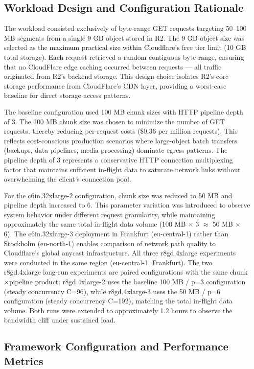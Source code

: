 \subsection{Workload Design and Configuration Rationale}

The workload consisted exclusively of byte-range GET requests targeting 50--100 MB segments from a single 9 GB object stored in R2. The 9 GB object size was selected as the maximum practical size within Cloudflare's free tier limit (10 GB total storage). Each request retrieved a random contiguous byte range, ensuring that no CloudFlare edge caching occurred between requests --- all traffic originated from R2's backend storage. This design choice isolates R2's core storage performance from CloudFlare's CDN layer, providing a worst-case baseline for direct storage access patterns.

The baseline configuration used 100 MB chunk sizes with HTTP pipeline depth of 3. The 100 MB chunk size was chosen to minimize the number of GET requests, thereby reducing per-request costs (\$0.36 per million requests). This reflects cost-conscious production scenarios where large-object batch transfers (backups, data pipelines, media processing) dominate egress patterns. The pipeline depth of 3 represents a conservative HTTP connection multiplexing factor that maintains sufficient in-flight data to saturate network links without overwhelming the client's connection pool.

For the c6in.32xlarge-2 configuration, chunk size was reduced to 50 MB and pipeline depth increased to 6. This parameter variation was introduced to observe system behavior under different request granularity, while maintaining approximately the same total in-flight data volume (100 MB $\times$ 3 $\approx$ 50 MB $\times$ 6). The c6in.32xlarge-3 deployment in Frankfurt (eu-central-1) rather than Stockholm (eu-north-1) enables comparison of network path quality to Cloudflare's global anycast infrastructure. All three r8gd.4xlarge experiments were conducted in the same region (eu-central-1, Frankfurt). The two r8gd.4xlarge long-run experiments are paired configurations with the same chunk$\times$pipeline product: r8gd.4xlarge-2 uses the baseline 100 MB / p=3 configuration (steady concurrency C=96), while r8gd.4xlarge-3 uses the 50 MB / p=6 configuration (steady concurrency C=192), matching the total in-flight data volume. Both runs were extended to approximately 1.2 hours to observe the bandwidth cliff under sustained load.

\subsection{Framework Configuration and Performance Metrics}


